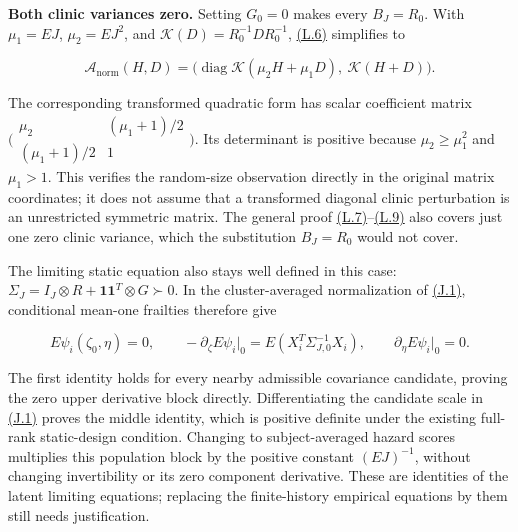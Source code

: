 \documentclass[11pt]{article}
\begin{document}
\textbf{Both clinic variances zero.} Setting \(G_0=0\) makes every \(B_J=R_0\). With \(\mu_1=EJ\), \(\mu_2=EJ^2\), and \(\mathcal K(D)=R_0^{-1}DR_0^{-1}\), \hyperref[eq:L.6]{(L.6)} simplifies to

\begin{equation*}
\mathcal A_{\mathrm{norm}}(H,D)
 =\big(\operatorname{diag}\mathcal K(\mu_2H+\mu_1D),\ \mathcal K(H+D)\big).\tag{L.10}\label{eq:L.10}
\end{equation*}

The corresponding transformed quadratic form has scalar coefficient matrix
\(\bigl(\begin{smallmatrix}\mu_2&(\mu_1+1)/2\\(\mu_1+1)/2&1\end{smallmatrix}\bigr)\).
Its determinant is positive because \(\mu_2\geq\mu_1^2\) and \(\mu_1>1\). This verifies the random-size observation directly in the original matrix coordinates; it does not assume that a transformed diagonal clinic perturbation is an unrestricted symmetric matrix. The general proof \hyperref[eq:L.7]{(L.7)}--\hyperref[eq:L.9]{(L.9)} also covers just one zero clinic variance, which the substitution \(B_J=R_0\) would not cover.

The limiting static equation also stays well defined in this case: \(\Sigma_J=I_J\otimes R+\mathbf1\mathbf1^T\otimes G\succ0\). In the cluster-averaged normalization of \hyperref[eq:J.1]{(J.1)}, conditional mean-one frailties therefore give

\begin{equation*}
E\psi_i(\zeta_0,\eta)=0,\qquad
-\partial_\zeta E\psi_i\big|_0=E(X_i^T\Sigma_{J,0}^{-1}X_i),\qquad
\partial_\eta E\psi_i\big|_0=0.\tag{L.11}\label{eq:L.11}
\end{equation*}

The first identity holds for every nearby admissible covariance candidate, proving the zero upper derivative block directly. Differentiating the candidate scale in \hyperref[eq:J.1]{(J.1)} proves the middle identity, which is positive definite under the existing full-rank static-design condition. Changing to subject-averaged hazard scores multiplies this population block by the positive constant \((EJ)^{-1}\), without changing invertibility or its zero component derivative. These are identities of the latent limiting equations; replacing the finite-history empirical equations by them still needs justification.
\end{document}
